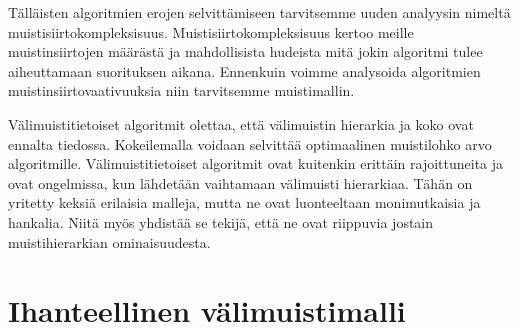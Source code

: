 \documentclass[finnish]{tktltiki2}
\theoremstyle{definition}
\theoremstyle{remark}
\begin{document}
Tälläisten algoritmien erojen selvittämiseen tarvitsemme uuden analyysin
nimeltä muistisiirtokompleksisuus. %
Muistisiirtokompleksisuus kertoo meille muistinsiirtojen määrästä ja
mahdollisista hudeista mitä jokin algoritmi tulee aiheuttamaan suorituksen
aikana. Ennenkuin voimme analysoida
algoritmien muistinsiirtovaativuuksia niin tarvitsemme muistimallin.

Välimuistitietoiset algoritmit olettaa,
että välimuistin hierarkia ja koko ovat ennalta tiedossa. Kokeilemalla voidaan
selvittää optimaalinen muistilohko arvo algoritmille. Välimuistitietoiset
algoritmit ovat kuitenkin erittäin rajoittuneita ja ovat ongelmissa, kun
lähdetään vaihtamaan välimuisti hierarkiaa. Tähän on yritetty keksiä
erilaisia malleja, mutta ne ovat luonteeltaan monimutkaisia ja hankalia. Niitä
myös yhdistää se tekijä, että ne ovat riippuvia jostain muistihierarkian
ominaisuudesta.
%




\section{Ihanteellinen välimuistimalli}
\end{document}

